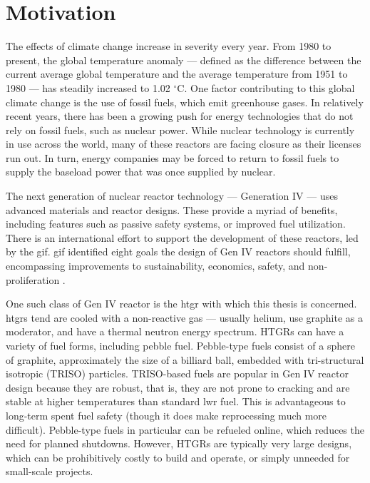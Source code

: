 \label{intro}
\section{Motivation}

The effects of climate change increase in severity every year. From 1980 to present, the global temperature anomaly --- defined as the difference between the current average global temperature and the average temperature from 1951 to 1980 --- has steadily increased to 1.02 $^{\circ}$C.  One factor contributing to this global climate change is the use of fossil fuels, which emit greenhouse gases.  In relatively recent years, there has been a growing push for energy technologies that do not rely on fossil fuels, such as nuclear power.  While nuclear technology is currently in use across the world, many of these reactors are facing closure as their licenses run out.  In turn, energy companies may be forced to return to fossil fuels to supply the baseload power that was once supplied by nuclear.  

The next generation of nuclear reactor technology --- Generation IV --- uses advanced materials and reactor designs.  These provide a myriad of benefits, including features such as passive safety systems, or improved fuel utilization.  There is an international effort to support the development of these reactors, led by the \acrfull{gif}.  \acrshort{gif} identified eight goals the design of Gen IV reactors should fulfill, encompassing improvements to sustainability, economics, safety, and non-proliferation \cite{noauthor_home_nodate-1}.

One such class of Gen IV reactor is the \acrfull{htgr} with which this thesis is concerned.  \acrshort{htgr}s tend are cooled with a non-reactive gas --- usually helium, use graphite as a moderator, and have a thermal neutron energy spectrum.  HTGRs can have a variety of fuel forms, including pebble fuel.  Pebble-type fuels consist of a sphere of graphite, approximately the size of a billiard ball, embedded with tri-structural isotropic (TRISO) particles.  TRISO-based fuels are popular in Gen IV reactor design because they are robust, that is, they are not prone to cracking and are stable at higher temperatures than standard \acrfull{lwr} fuel.  This is advantageous to long-term spent fuel safety (though it does make reprocessing much more difficult).  Pebble-type fuels in particular can be refueled online, which reduces the need for planned shutdowns.  However, HTGRs are typically very large designs, which can be prohibitively costly to build and operate, or simply unneeded for small-scale projects.

